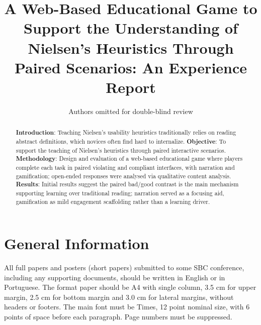 \documentclass[12pt]{article}
\title{A Web-Based Educational Game to Support the Understanding of
Nielsen's Heuristics Through Paired Scenarios: An Experience Report}
\author{Authors omitted for double-blind review}
\begin{document}
 


\maketitle

\thispagestyle{plain}

\begin{abstract}
\textbf{Introduction}: Teaching Nielsen's usability heuristics traditionally relies on reading abstract definitions, which novices often find hard to internalize.
\textbf{Objective}: To support the teaching of Nielsen's heuristics through paired interactive scenarios.
\textbf{Methodology}: Design and evaluation of a web-based educational game where players complete each task in paired violating and compliant interfaces, with narration and gamification; open-ended responses were analysed via qualitative content analysis.
\textbf{Results}: Initial results suggest the paired bad/good contrast is the main mechanism supporting learning over traditional reading; narration served as a focusing aid, gamification as mild engagement scaffolding rather than a learning driver.
\end{abstract}



\section{General Information}

All full papers and posters (short papers) submitted to some SBC conference,
including any supporting documents, should be written in English or in
Portuguese. The format paper should be A4 with single column, 3.5 cm for upper
margin, 2.5 cm for bottom margin and 3.0 cm for lateral margins, without
headers or footers. The main font must be Times, 12 point nominal size, with 6
points of space before each paragraph. Page numbers must be suppressed.
\end{document}

